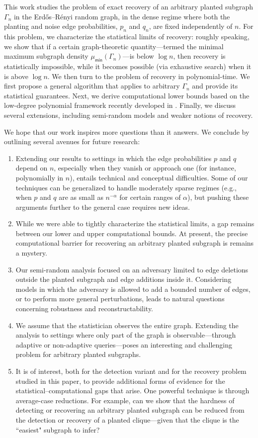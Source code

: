 \documentclass[12pt]{article}
\newcommand{\s}[1]{\mathsf{#1}}
\begin{document}
This work studies the problem of exact recovery of an arbitrary planted subgraph $\Gamma_n$ in the Erd\H{o}s--R\'enyi random graph, in the dense regime where both the planting and noise edge probabilities, $p_n$ and $q_n$, are fixed independently of $n$. For this problem, we characterize the statistical limits of recovery: roughly speaking, we show that if a certain graph-theoretic quantity—termed the minimal maximum subgraph density $\mu_{\s{min}}(\Gamma_n)$—is below $\log n$, then recovery is statistically impossible, while it becomes possible (via exhaustive search) when it is above $\log n$. We then turn to the problem of recovery in polynomial-time. We first propose a general algorithm that applies to arbitrary $\Gamma_n$ and provide its statistical guarantees. Next, we derive computational lower bounds based on the low-degree polynomial framework recently developed in \cite{SchrammWein2022}. Finally, we discuss several extensions, including semi-random models and weaker notions of recovery.

We hope that our work inspires more questions than it answers. We conclude by outlining several avenues for future research:
\begin{enumerate}[leftmargin=*]
    \item Extending our results to settings in which the edge probabilities $p$ and $q$ depend on $n$, especially when they vanish or approach one (for instance, polynomially in $n$), entails technical and conceptual difficulties. Some of our techniques can be generalized to handle moderately sparse regimes (e.g., when $p$ and $q$ are as small as $n^{-\alpha}$ for certain ranges of $\alpha$), but pushing these arguments further to the general case requires new ideas.
    \item While we were able to tightly characterize the statistical limits, a gap remains between our lower and upper computational bounds. At present, the precise computational barrier for recovering an arbitrary planted subgraph is remains a mystery.
    \item Our semi-random analysis focused on an adversary limited to edge deletions outside the planted subgraph and edge additions inside it. Considering models in which the adversary is allowed to add a bounded number of edges, or to perform more general perturbations, leads to natural questions concerning robustness and reconstructability.
    \item We assume that the statistician observes the entire graph. Extending the analysis to settings where only part of the graph is observable—through adaptive or non-adaptive queries—poses an interesting and challenging problem for arbitrary planted subgraphs.
    \item It is of interest, both for the detection variant and for the recovery problem studied in this paper, to provide additional forms of evidence for the statistical–computational gaps that arise. One powerful technique is through average-case reductions. For example, can we show that the hardness of detecting or recovering an arbitrary planted subgraph can be reduced from the detection or recovery of a planted clique—given that the clique is the ``easiest" subgraph to infer?
\end{enumerate}
\end{document}
